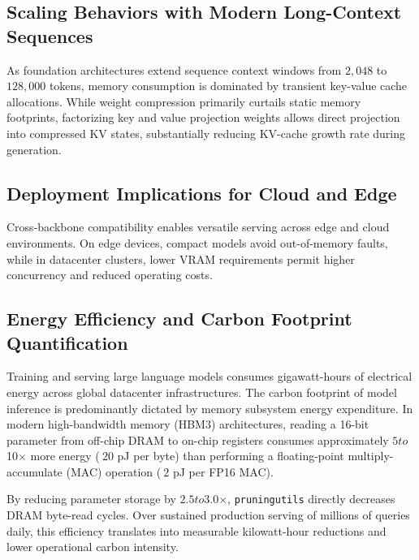\subsection{Scaling Behaviors with Modern Long-Context Sequences}
As foundation architectures extend sequence context windows from $2{,}048$ to $128{,}000$ tokens, memory consumption is dominated by transient key-value cache allocations. While weight compression primarily curtails static memory footprints, factorizing key and value projection weights allows direct projection into compressed KV states, substantially reducing KV-cache growth rate during generation.

\subsection{Deployment Implications for Cloud and Edge}
Cross-backbone compatibility enables versatile serving across edge and cloud environments. On edge devices, compact models avoid out-of-memory faults, while in datacenter clusters, lower VRAM requirements permit higher concurrency and reduced operating costs.

\subsection{Energy Efficiency and Carbon Footprint Quantification}
Training and serving large language models consumes gigawatt-hours of electrical energy across global datacenter infrastructures. The carbon footprint of model inference is predominantly dictated by memory subsystem energy expenditure. In modern high-bandwidth memory (HBM3) architectures, reading a 16-bit parameter from off-chip DRAM to on-chip registers consumes approximately $5$\times$ to $10$\times$ more energy ($~20$ pJ per byte) than performing a floating-point multiply-accumulate (MAC) operation ($~2$ pJ per FP16 MAC).

By reducing parameter storage by $2.5$\times$ to $3.0$\times$, \texttt{pruningutils} directly decreases DRAM byte-read cycles. Over sustained production serving of millions of queries daily, this efficiency translates into measurable kilowatt-hour reductions and lower operational carbon intensity.
